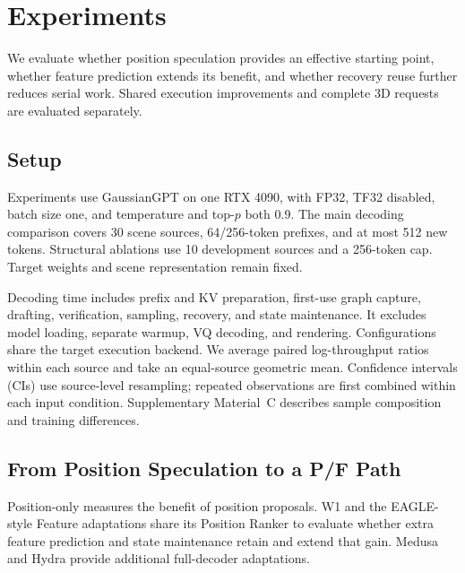 \section{Experiments}
\label{sec:experiments}
We evaluate whether position speculation provides an effective starting point, whether feature prediction extends its benefit, and whether recovery reuse further reduces serial work. Shared execution improvements and complete 3D requests are evaluated separately.

\subsection{Setup}
Experiments use GaussianGPT on one RTX 4090, with FP32, TF32 disabled, batch size one, and temperature and top-$p$ both 0.9. The main decoding comparison covers 30 scene sources, 64/256-token prefixes, and at most 512 new tokens. Structural ablations use 10 development sources and a 256-token cap. Target weights and scene representation remain fixed.

Decoding time includes prefix and KV preparation, first-use graph capture, drafting, verification, sampling, recovery, and state maintenance. It excludes model loading, separate warmup, VQ decoding, and rendering. Configurations share the target execution backend. We average paired log-throughput ratios within each source and take an equal-source geometric mean. Confidence intervals (CIs) use source-level resampling; repeated observations are first combined within each input condition. Supplementary Material~C describes sample composition and training differences.

\subsection{From Position Speculation to a P/F Path}
Position-only measures the benefit of position proposals. W1 and the EAGLE-style Feature adaptations share its Position Ranker to evaluate whether extra feature prediction and state maintenance retain and extend that gain. Medusa and Hydra provide additional full-decoder adaptations.


